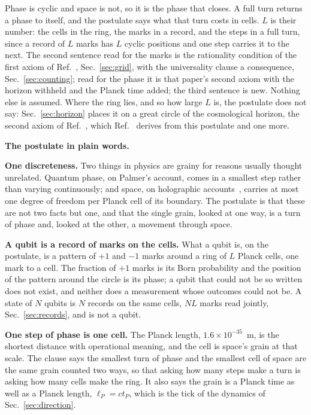 \documentclass[aps,prd,twocolumn,superscriptaddress,nofootinbib]{revtex4-2}
\begin{document}
Phase is cyclic and space is not, so it is the phase that closes. A full turn returns a phase to itself, and the postulate says what that turn costs in cells. $L$ is their number: the cells in the ring, the marks in a record, and the steps in a full turn, since a record of $L$ marks has $L$ cyclic positions and one step carries it to the next. The second sentence read for the marks is the rationality condition of the first axiom of Ref.~\cite{korytko2026}, Sec.~\ref{sec:grid}, with the universality clause a consequence, Sec.~\ref{sec:counting}; read for the phase it is that paper's second axiom with the horizon withheld and the Planck time added; the third sentence is new. Nothing else is assumed. Where the ring lies, and so how large $L$ is, the postulate does not say: Sec.~\ref{sec:horizon} places it on a great circle of the cosmological horizon, the second axiom of Ref.~\cite{korytko2026}, which Ref.~\cite{korytko2026d} derives from this postulate and one more.

\textbf{The postulate in plain words.}

\textbf{One discreteness.} Two things in physics are grainy for reasons usually thought unrelated. Quantum phase, on Palmer's account, comes in a smallest step rather than varying continuously; and space, on holographic accounts~\cite{thooft1993,susskind1995}, carries at most one degree of freedom per Planck cell of its boundary. The postulate is that these are not two facts but one, and that the single grain, looked at one way, is a turn of phase and, looked at the other, a movement through space.

\textbf{A qubit is a record of marks on the cells.} What a qubit is, on the postulate, is a pattern of $+1$ and $-1$ marks around a ring of $L$ Planck cells, one mark to a cell. The fraction of $+1$ marks is its Born probability and the position of the pattern around the circle is its phase; a qubit that could not be so written does not exist, and neither does a measurement whose outcomes could not be. A state of $N$ qubits is $N$ records on the same cells, $NL$ marks read jointly, Sec.~\ref{sec:records}, and is not a qubit.

\textbf{One step of phase is one cell.} The Planck length, $1.6\times10^{-35}$~m, is the shortest distance with operational meaning, and the cell is space's grain at that scale. The clause says the smallest turn of phase and the smallest cell of space are the same grain counted two ways, so that asking how many steps make a turn is asking how many cells make the ring. It also says the grain is a Planck time as well as a Planck length, $\ell_P = ct_P$, which is the tick of the dynamics of Sec.~\ref{sec:direction}.
\end{document}
